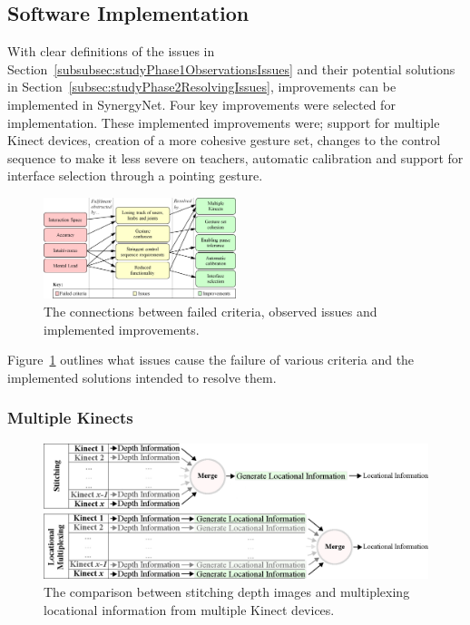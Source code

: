 \documentclass[link]{IWCOMP}
\begin{document}
\subsection{Software Implementation}
\label{subsec:studyPhase2Implementation}

With clear definitions of the issues in Section~\ref{subsubsec:studyPhase1ObservationsIssues} and their potential solutions in Section~\ref{subsec:studyPhase2ResolvingIssues}, improvements can be implemented in SynergyNet.
Four key improvements were selected for implementation.
These implemented improvements were; support for multiple Kinect devices, creation of a more cohesive gesture set, changes to the control sequence to make it less severe on teachers, automatic calibration and support for interface selection through a pointing gesture.

\begin{figure}[h]
  \centering
  \includegraphics[width=0.5\textwidth]{figures/issue_flow_diagram.png}
  \caption{The connections between failed criteria, observed issues and implemented improvements.}
  \label{fig:issueFlow}
\end{figure}

Figure~\ref{fig:issueFlow} outlines what issues cause the failure of various criteria and the implemented solutions intended to resolve them.

\subsubsection{Multiple Kinects} 
\label{subsubsec:studyPhase2ImplementationMultipleKinects}

\begin{figure}[t]
  \centering
  \includegraphics[width=1\textwidth]{figures/multiplexing_flow_diagram.png}
  \caption{The comparison between stitching depth images and multiplexing locational information from multiple Kinect devices.}
  \label{fig:multiplexing}
\end{figure}
\end{document}
